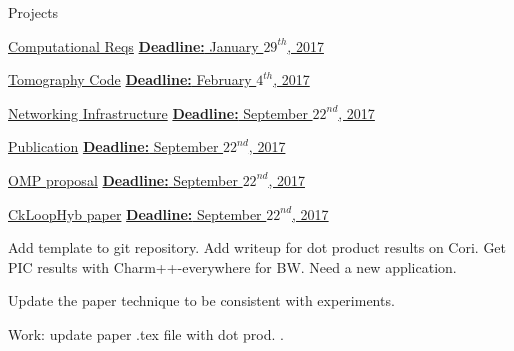 \begin{columns}  %

\begin{column}{0.10\linewidth}

\begin{block}{Projects}




\underline{Computational Reqs} 
\underline{\textbf{Deadline:} January $29^{th}$, 2017} 
\begin{enumerate}
\pitem 
\pitem 
\end{enumerate}

\underline{Tomography Code} 
\underline{\textbf{Deadline:} February $4^{th}$, 2017} 
\begin{enumerate}
\pitem 
\pitem 
\end{enumerate}

\underline{Networking Infrastructure} 
\underline{\textbf{Deadline:} September $22^{nd}$, 2017} 
\begin{enumerate}
\pitem 
\pitem 
\end{enumerate}

\underline{Publication} 
\underline{\textbf{Deadline:} September $22^{nd}$, 2017} 
\begin{enumerate}
\pitem 
\pitem 
\end{enumerate}


\underline{OMP proposal} 
\underline{\textbf{Deadline:} September $22^{nd}$, 2017} 
\begin{enumerate}
\pitem 
\pitem 
\end{enumerate} 

\underline{CkLoopHyb paper}
\underline{\textbf{Deadline:} September $22^{nd}$, 2017}
\begin{enumerate}
\pitem Add template to git repository.
\pitem Add writeup for dot product results on Cori.
\pitem Get PIC results with Charm++-everywhere for BW.
\pitem Need a new application. 

\ptask Update the paper technique to be consistent with experiments.
 
\ptask Work: update paper .tex file with dot prod. .


\end{enumerate}
\end{block}
\end{column}
\end{columns}

